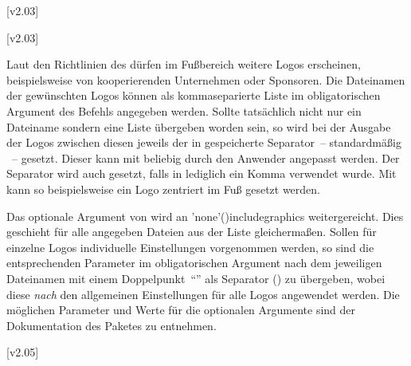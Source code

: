 \begin{DeclareEntity*}{}
\begin{DeclareEntity*}{}
\begin{DeclareEntity*}{}
\begin{Declaration}
  {}
  [v2.03]
\begin{Declaration}
  {}
  [v2.03]

Laut den Richtlinien des \CDs dürfen im Fußbereich weitere Logos erscheinen, 
beispielsweise von kooperierenden Unternehmen oder Sponsoren. Die Dateinamen 
der gewünschten Logos können als kommaseparierte Liste im obligatorischen 
Argument des Befehls  angegeben werden. Sollte tatsächlich 
nicht nur ein Dateiname sondern eine Liste übergeben worden sein, so wird bei 
der Ausgabe der Logos zwischen diesen jeweils der in  
gespeicherte Separator~-- standardmäßig ~-- gesetzt. Dieser kann 
mit  
beliebig durch den Anwender angepasst werden. Der Separator wird auch gesetzt, 
falls in  lediglich ein Komma verwendet wurde. Mit 
 kann so beispielsweise ein 
Logo zentriert im Fuß gesetzt werden.

Das optionale Argument von  wird an 
\Macro'none'(){includegraphics} weitergereicht. Dies 
geschieht für alle angegeben Dateien aus der Liste gleichermaßen. Sollen für 
einzelne Logos individuelle Einstellungen vorgenommen werden, so sind die 
entsprechenden Parameter im obligatorischen Argument nach dem jeweiligen 
Dateinamen mit einem Doppelpunkt~\enquote{\PValue{:}} als Separator 
() zu 
übergeben, wobei diese \emph{nach} den allgemeinen Einstellungen für alle Logos 
angewendet werden. Die möglichen Parameter und Werte für die optionalen 
Argumente sind der Dokumentation des Paketes  zu entnehmen.
\end{Declaration}
\end{Declaration}

\begin{Declaration}
  {}
  [v2.05]


\end{Declaration}
\end{DeclareEntity*}
\end{DeclareEntity*}
\end{DeclareEntity*}
